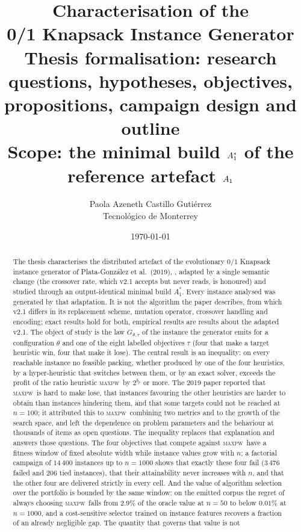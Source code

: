 \documentclass[a4paper,11pt]{article}
\title{Characterisation of the \code{EvolutionaryGenerator v2.1}\\
0/1 Knapsack Instance Generator\\[4pt]
\large Thesis formalisation: research questions, hypotheses, objectives,\\
propositions, campaign design and outline\\[2pt]
\normalsize Scope: the minimal build $\Astar$ of the reference artefact $A_{1}$}
\author{Paola Azeneth Castillo Guti\'errez\\
\small Tecnol\'ogico de Monterrey}
\date{\today}
\newcommand{\bp}{b_{p}}
\newcommand{\code}[1]{\path{#1}}
\newcommand{\Astar}{A_{1}^{*}}
\newcommand{\Gtt}{G_{\theta,\tau}}
\newcommand{\MAXPW}{\textsc{maxpw}}
\theoremstyle{plain}
\theoremstyle{definition}
\theoremstyle{remark}
\begin{document}
\maketitle

\begin{abstract}
\noindent
The thesis characterises the distributed artefact of the evolutionary $0/1$ Knapsack instance
generator of Plata-Gonz\'alez et al.\ (2019), \code{EvolutionaryGenerator v2.1}, adapted by a
single semantic change (the crossover rate, which v2.1 accepts but never reads, is honoured)
and studied through an output-identical minimal build $\Astar$. Every instance analysed was
generated by that adaptation. It is not the algorithm the paper describes, from which v2.1
differs in its replacement scheme, mutation operator, crossover handling and encoding; exact
results hold for both, empirical results are results about the adapted v2.1. The object of study is the law $\Gtt$ of the
instance the generator emits for a configuration $\theta$ and one of the eight labelled
objectives $\tau$ (four that make a target heuristic win, four that make it lose). The
central result is an inequality: on every reachable instance no feasible packing, whether
produced by one of the four heuristics, by a hyper-heuristic that switches between them, or
by an exact solver, exceeds the profit of the ratio heuristic \MAXPW\ by $2^{\bp}$ or more.
The 2019 paper reported that \MAXPW\ is hard to make lose, that instances favouring the
other heuristics are harder to obtain than instances hindering them, and that some targets
could not be reached at $n=100$; it attributed this to \MAXPW\ combining two metrics and to
the growth of the search space, and left the dependence on problem parameters and the
behaviour at thousands of items as open questions. The inequality replaces that explanation
and answers those questions. The four objectives that compete against \MAXPW\ have a fitness
window of fixed absolute width while instance values grow with $n$; a factorial campaign of
$14\,400$ instances up to $n=1000$ shows that exactly these four fail ($3\,476$ failed and
$206$ tied instances), that their attainability never increases with $n$, and that the
other four are delivered strictly in every cell. And the
value of algorithm selection over the portfolio is bounded by the same window: on the emitted
corpus the regret of always choosing \MAXPW\ falls from $2.9\%$ of the oracle value at $n=50$
to below $0.01\%$ at $n=1000$, and a cost-sensitive selector trained on instance features
recovers a fraction of an already negligible gap. The quantity that governs that value is not

\end{abstract}
\end{document}
